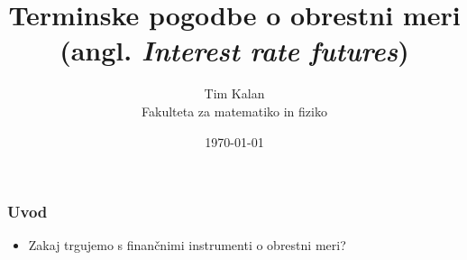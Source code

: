 \documentclass[14pt]{beamer}
\author{Tim Kalan \\ Fakulteta za matematiko in fiziko}
\title{
    Terminske pogodbe o obrestni meri \\ 
    \large (angl. \textit{Interest rate futures})}
\date{\today}
\begin{document}
\begin{frame}
    \titlepage
\end{frame}

\begin{frame}
    \frametitle{Uvod}

    \begin{itemize}
        \item Zakaj trgujemo s finančnimi instrumenti o obrestni meri?
    \end{itemize}
\end{frame}
\end{document}
